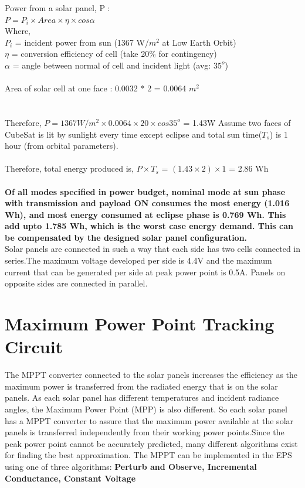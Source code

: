 Power from a solar panel, P :\\
\hspace*{2cm} $P = P_{i} \times Area \times \eta  \times cos \alpha $ 
\\
 Where, \\
 $P_{i}$ = incident power from sun (1367 W/$m^2$ at Low Earth Orbit)
\\  $\eta$ = conversion efficiency of cell (take 20\% for contingency)
\\  $\alpha$ = angle between normal of cell and incident light (avg: $35^{o} $)\\ \\
Area of solar cell at one face : 0.0032 * 2 = 0.0064 $m^2$\\
\\ \\ Therefore, $P = 1367 W/m^2 \times 0.0064 \times 20  \times cos 35^{o} $ = 1.43W
Assume two faces of CubeSat is lit by sunlight every time except eclipse and total sun time($T_{s}$) is 1 hour (from orbital parameters).
\\ \\ Therefore, total energy produced is, $P \times  T_{s}$ = $(1.43 \times 2) \times 1$ = 2.86 Wh
\\ \\ \textbf{Of all modes specified in power budget, nominal mode at sun phase with transmission and payload ON consumes the most energy (1.016 Wh), and most energy consumed at eclipse phase is 0.769 Wh. This add upto 1.785 Wh, which is the worst case energy demand. This can be compensated by the designed solar panel configuration.}
\\
Solar panels are connected in such a way that each side has two cells connected in series.The maximum voltage developed per side is 4.4V and the maximum current that can be generated per side at peak power point is 0.5A.
Panels on opposite sides are connected in parallel.


\section[MPPT Circuit]{Maximum Power Point Tracking Circuit}
The MPPT converter connected to the solar panels increases the efficiency as the
maximum power is transferred from the radiated energy that is on the solar panels.
As each solar panel has different temperatures and incident radiance angles, the
Maximum Power Point (MPP) is also different. So each solar panel has a MPPT
converter to assure that the maximum power available at the solar panels is
transferred independently from their working power points.Since the peak power
point cannot be accurately predicted, many different algorithms exist for finding
the best approximation. The MPPT can be implemented in the EPS using one of three algorithms:
{\bf Perturb and Observe, Incremental Conductance, Constant Voltage}

